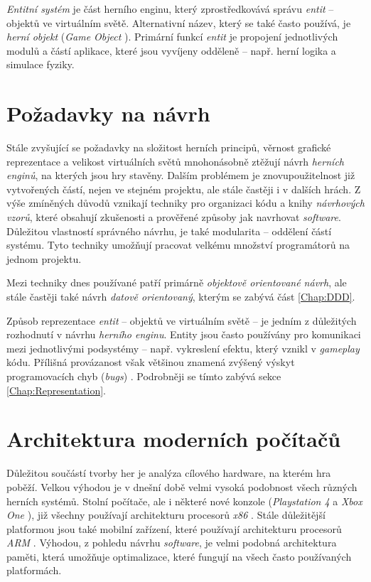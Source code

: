 \emph{Entitní systém} je část herního enginu, který zprostředkovává správu \emph{entit} -- objektů ve virtuálním světě. Alternativní název, který se také často používá, je \emph{herní objekt} (\emph{Game Object} \cite{UnityGo}). Primární funkcí \emph{entit} je propojení jednotlivých modulů a částí aplikace, které jsou vyvíjeny odděleně -- např. herní logika a simulace fyziky.

\section{Požadavky na návrh}

Stále zvyšující se požadavky na složitost herních principů, věrnost grafické reprezentace a velikost virtuálních světů mnohonásobně ztěžují návrh \emph{herních enginů}, na kterých jsou hry stavěny. Dalším problémem je znovupoužitelnost již vytvořených částí, nejen ve stejném projektu, ale stále častěji i v dalších hrách. Z výše zmíněných důvodů vznikají techniky pro organizaci kódu a knihy \emph{návrhových vzorů}\cite{DesignPatterns}\cite{GameDesignPatterns}, které obsahují zkušenosti a prověřené způsoby jak navrhovat \emph{software}. Důležitou vlastností správného návrhu, je také modularita -- oddělení částí systému. Tyto techniky umožňují pracovat velkému množství programátorů na jednom projektu.

Mezi techniky dnes používané patří primárně \emph{objektově orientované návrh}, ale stále častěji také návrh \emph{datově orientovaný}, kterým se zabývá část \ref{Chap:DDD}.

Způsob reprezentace \emph{entit} -- objektů ve virtuálním světě -- je jedním z důležitých rozhodnutí v návrhu \emph{herního enginu}. Entity jsou často používány pro komunikaci mezi jednotlivými podsystémy -- např. vykreslení efektu, který vznikl v \emph{gameplay} kódu. Přílišná provázanost však většinou znamená zvýšený výskyt programovacích chyb (\emph{bugs}) \cite{GameDesignPatterns}. Podrobněji se tímto zabývá sekce \ref{Chap:Representation}.

\section{Architektura moderních počítačů}

Důležitou součástí tvorby her je analýza cílového hardware, na kterém hra poběží. Velkou výhodou je v dnešní době velmi vysoká podobnost všech různých herních systémů. Stolní počítače, ale i některé nové konzole (\emph{Playstation 4} a \emph{Xbox One} \cite{Ps4Xbox}), již všechny používají architekturu procesorů \emph{x86} \cite{IntelX86-64} \cite{AmdX86-64}. Stále důležitější platformou jsou také mobilní zařízení, které používají architekturu procesorů \emph{ARM} \cite{ARM}. Výhodou, z pohledu návrhu \emph{software}, je velmi podobná architektura paměti, která umožňuje optimalizace, které fungují na všech často používaných platformách.

